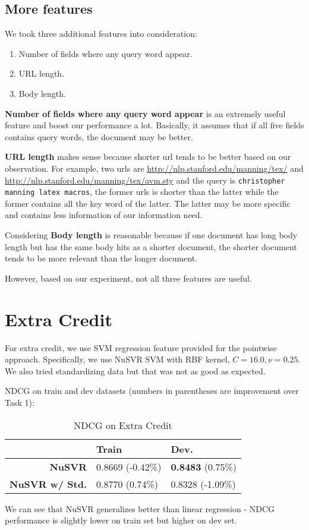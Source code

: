 \documentclass{article}
\begin{document}
\subsection{More features}

We took three additional features into consideration:

\begin{enumerate}
    \item Number of fields where any query word appear.
    \item URL length.
    \item Body length.
\end{enumerate}

\textbf{Number of fields where any query word appear} is an extremely useful feature and boost our performance a lot. Basically, it assumes that if all five fields contains query words, the document may be better.

\textbf{URL length} makes sense because shorter url tends to be better based on our observation. For example, two urls are \url{http://nlp.stanford.edu/manning/tex/} and \url{http://nlp.stanford.edu/manning/tex/avm.sty} and the query is \texttt{christopher manning latex macros}, the former urls is shorter than the latter while the former contains all the key word of the latter. The latter may be more specific and contains less information of our information need.

Considering \textbf{Body length} is reasonable because if one document has long body length but has the same body hits as a shorter document, the shorter document tends to be more relevant than the longer document.

However, based on our experiment, not all three features are useful.

\section{Extra Credit}

For extra credit, we use SVM regression feature provided for the pointwise approach.
Specifically, we use NuSVR SVM with RBF kernel, $C=16.0,\nu=0.25$. We also tried standardizing data but that was not as good as expected.

NDCG on train and dev datasets (numbers in parentheses are improvement over Task 1):

\begin{table}[!htb]
    \centering
    \begin{tabular}{| r | l | l |}
        \hline
        & \textbf{Train} & \textbf {Dev.} \\
        \hline
        \textbf{NuSVR} & 0.8669 (-0.42\%) & \textbf{0.8483} (0.75\%) \\
        \hline
        \textbf{NuSVR w/ Std.} & 0.8770 (0.74\%) & 0.8328 (-1.09\%) \\
        \hline
    \end{tabular}
    \caption{NDCG on Extra Credit}
\end{table}

We can see that NuSVR generalizes better than linear regression - NDCG performance is slightly lower on train set but higher on dev set.
\end{document}
